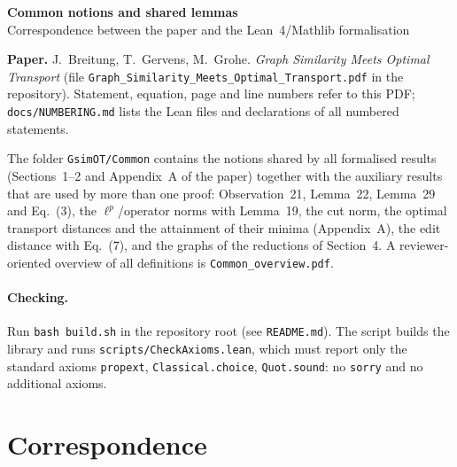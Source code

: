 \documentclass[10pt,a4paper]{article}
\begin{document}
\begin{center}{\Large\bfseries Common notions and shared lemmas}\\[4pt]

{\small Correspondence between the paper and the Lean~4/Mathlib formalisation}\end{center}

\noindent\textbf{Paper.} J.~Breitung, T.~Gervens, M.~Grohe. \emph{Graph Similarity Meets Optimal Transport} (file \texttt{Graph\_Similarity\_Meets\_Optimal\_Transport.pdf} in the repository). Statement, equation, page and line numbers refer to this PDF; \texttt{docs/NUMBERING.md} lists the Lean files and declarations of all numbered statements.\par\smallskip

The folder \texttt{GsimOT/Common} contains the notions shared by all formalised results (Sections~1--2 and Appendix~A of the paper) together with the auxiliary results that are used by more than one proof: Observation~21, Lemma~22, Lemma~29 and Eq.~(3), the $\ell^p$/operator norms with Lemma~19, the cut norm, the optimal transport distances and the attainment of their minima (Appendix~A), the edit distance with Eq.~(7), and the graphs of the reductions of Section~4. A reviewer-oriented overview of all definitions is \texttt{Common\_overview.pdf}.\par\paragraph{Checking.} Run \texttt{bash build.sh} in the repository root (see \texttt{README.md}). The script builds the library and runs \texttt{scripts/CheckAxioms.lean}, which must report only the standard axioms \texttt{propext}, \texttt{Classical.choice}, \texttt{Quot.sound}: no \texttt{sorry} and no additional axioms.

\section*{Correspondence}
\end{document}
